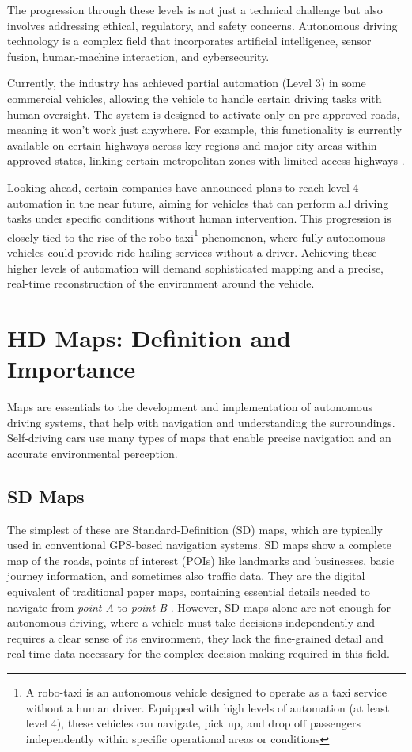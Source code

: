 The progression through these levels is not just a technical challenge but also involves addressing ethical, regulatory, and safety concerns. Autonomous driving technology is a complex field that incorporates artificial intelligence, sensor fusion, human-machine interaction, and cybersecurity. 

Currently, the industry has achieved partial automation (Level 3) in some commercial vehicles, allowing the vehicle to handle certain driving tasks with human oversight. The system is designed to activate only on pre-approved roads, meaning it won’t work just anywhere. For example, this functionality is currently available on certain highways across key regions and major city areas within approved states, linking certain metropolitan zones with limited-access highways \cite{bmw2024}.

Looking ahead, certain companies have announced plans to reach level 4 automation in the near future, aiming for vehicles that can perform all driving tasks under specific conditions without human intervention. This progression is closely tied to the rise of the robo-taxi\footnote{A robo-taxi is an autonomous vehicle designed to operate as a taxi service without a human driver. Equipped with high levels of automation (at least level 4), these vehicles can navigate, pick up, and drop off passengers independently within specific operational areas or conditions} phenomenon, where fully autonomous vehicles could provide ride-hailing services without a driver. Achieving these higher levels of automation will demand sophisticated mapping and a precise, real-time reconstruction of the environment around the vehicle.

\section{HD Maps: Definition and Importance}

Maps are essentials to the development and implementation of autonomous driving systems, that help with navigation and understanding the surroundings. Self-driving cars use many types of maps that enable precise navigation and an accurate environmental perception. 

\subsection{SD Maps}
The simplest of these are Standard-Definition (SD) maps, which are typically used in conventional GPS-based navigation systems. SD maps show a complete map of the roads, points of interest (POIs) like landmarks and businesses, basic journey information, and sometimes also traffic data. They are the digital equivalent of traditional paper maps, containing essential details needed to navigate from \textit{point A} to \textit{point B} \cite{Mudduluru_SD_vs_HD_Maps, Chiang2021}.
However, SD maps alone are not enough for autonomous driving, where a vehicle must take decisions independently and requires a clear sense of its environment, they lack the fine-grained detail and real-time data necessary for the complex decision-making required in this field.


